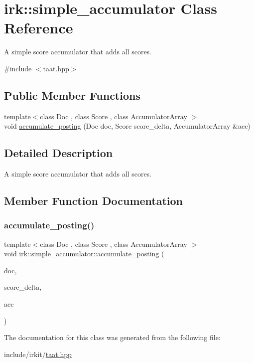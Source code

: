 \hypertarget{classirk_1_1simple__accumulator}{}\section{irk\+:\+:simple\+\_\+accumulator Class Reference}
\label{classirk_1_1simple__accumulator}


A simple score accumulator that adds all scores.  




{\ttfamily \#include $<$taat.\+hpp$>$}

\subsection*{Public Member Functions}
\begin{DoxyCompactItemize}
\item 
{\footnotesize template$<$class Doc , class Score , class Accumulator\+Array $>$ }\\void \mbox{\hyperlink{classirk_1_1simple__accumulator_a641d831933fba432b05f485829e3b8d4}{accumulate\+\_\+posting}} (Doc doc, Score score\+\_\+delta, Accumulator\+Array \&acc)
\end{DoxyCompactItemize}


\subsection{Detailed Description}
A simple score accumulator that adds all scores. 

\subsection{Member Function Documentation}
\mbox{\label{classirk_1_1simple__accumulator_a641d831933fba432b05f485829e3b8d4}} 
\subsubsection{\texorpdfstring{accumulate\+\_\+posting()}{accumulate\_posting()}}
{\footnotesize\ttfamily template$<$class Doc , class Score , class Accumulator\+Array $>$ \\
void irk\+::simple\+\_\+accumulator\+::accumulate\+\_\+posting (\begin{DoxyParamCaption}\item[{Doc}]{doc,  }\item[{Score}]{score\+\_\+delta,  }\item[{Accumulator\+Array \&}]{acc }\end{DoxyParamCaption})\hspace{0.3cm}{\ttfamily [inline]}}



The documentation for this class was generated from the following file\+:\begin{DoxyCompactItemize}
\item 
include/irkit/\mbox{\hyperlink{taat_8hpp}{taat.\+hpp}}\end{DoxyCompactItemize}
